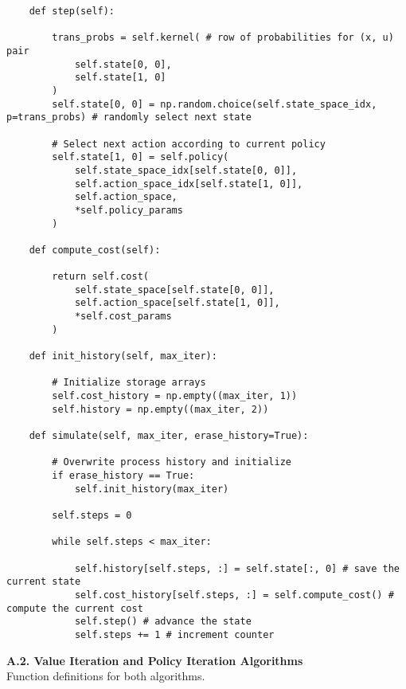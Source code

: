 \documentclass[10pt]{article}
\newcommand{\1}[1]{\mathbbm{1}_{#1}}
\begin{document}
\begin{verbatim}
    def step(self):

        trans_probs = self.kernel( # row of probabilities for (x, u) pair
            self.state[0, 0],
            self.state[1, 0]
        ) 
        self.state[0, 0] = np.random.choice(self.state_space_idx, p=trans_probs) # randomly select next state

        # Select next action according to current policy
        self.state[1, 0] = self.policy(
            self.state_space_idx[self.state[0, 0]],
            self.action_space_idx[self.state[1, 0]],
            self.action_space,
            *self.policy_params
        )

    def compute_cost(self):

        return self.cost(
            self.state_space[self.state[0, 0]],
            self.action_space[self.state[1, 0]],
            *self.cost_params
        )
    
    def init_history(self, max_iter):
        
        # Initialize storage arrays 
        self.cost_history = np.empty((max_iter, 1))
        self.history = np.empty((max_iter, 2))

    def simulate(self, max_iter, erase_history=True):

        # Overwrite process history and initialize
        if erase_history == True:
            self.init_history(max_iter)
            
        self.steps = 0

        while self.steps < max_iter:

            self.history[self.steps, :] = self.state[:, 0] # save the current state
            self.cost_history[self.steps, :] = self.compute_cost() # compute the current cost
            self.step() # advance the state
            self.steps += 1 # increment counter
    \end{verbatim}
    {\bf A.2. Value Iteration and Policy Iteration Algorithms}\\[5pt]
    Function definitions for both algorithms.
\end{document}
